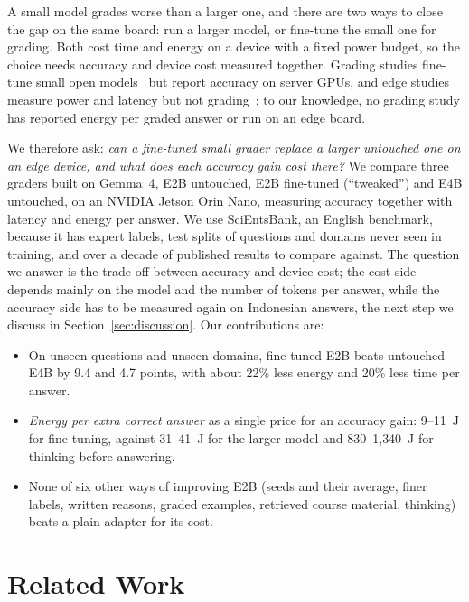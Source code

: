 \documentclass[journal]{IEEEtran}
\begin{document}
A small model grades worse than a larger one, and there are two ways to close the gap on the same board: run a larger model, or fine-tune the small one for grading.
Both cost time and energy on a device with a fixed power budget, so the choice needs accuracy and device cost measured together.
Grading studies fine-tune small open models~\cite{ormerod2024gpupoor,aggarwal2024engsaf} but report accuracy on server GPUs, and edge studies measure power and latency but not grading~\cite{arya2025edgepower}; to our knowledge, no grading study has reported energy per graded answer or run on an edge board.

We therefore ask: \textit{can a fine-tuned small grader replace a larger untouched one on an edge device, and what does each accuracy gain cost there?}
We compare three graders built on Gemma~4, E2B untouched, E2B fine-tuned (``tweaked'') and E4B untouched, on an NVIDIA Jetson Orin Nano, measuring accuracy together with latency and energy per answer.
We use SciEntsBank, an English benchmark, because it has expert labels, test splits of questions and domains never seen in training, and over a decade of published results to compare against.
The question we answer is the trade-off between accuracy and device cost; the cost side depends mainly on the model and the number of tokens per answer, while the accuracy side has to be measured again on Indonesian answers, the next step we discuss in Section~\ref{sec:discussion}.
Our contributions are:
\begin{itemize}
\item On unseen questions and unseen domains, fine-tuned E2B beats untouched E4B by 9.4 and 4.7 points, with about 22\% less energy and 20\% less time per answer.
\item \textit{Energy per extra correct answer} as a single price for an accuracy gain: 9--11~J for fine-tuning, against 31--41~J for the larger model and 830--1{,}340~J for thinking before answering.
\item None of six other ways of improving E2B (seeds and their average, finer labels, written reasons, graded examples, retrieved course material, thinking) beats a plain adapter for its cost.
\end{itemize}

\section{Related Work}
\label{sec:related}
\end{document}
